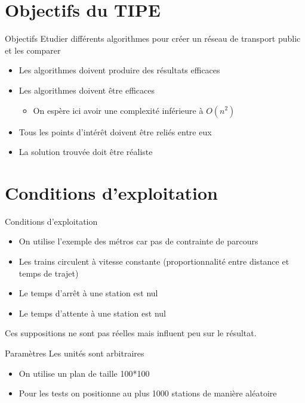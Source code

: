 \documentclass[aspectratio=43,11pt]{beamer}
\begin{document}
\section{Objectifs du TIPE}
\begin{frame}{Objectifs}
    Etudier différents algorithmes pour créer un réseau de transport public et les comparer
    \begin{itemize}
        \item Les algorithmes doivent produire des résultats efficaces
        \item Les algorithmes doivent être efficaces
        \begin{itemize}
            \item On espère ici avoir une complexité inférieure à $O(n^2)$
        \end{itemize}
        \item Tous les points d'intérêt doivent être reliés entre eux
        \item La solution trouvée doit être réaliste
    \end{itemize}
\end{frame}
\section{Conditions d'exploitation}
\begin{frame}{Conditions d'exploitation}
    \begin{itemize}
        \item On utilise l'exemple des métros car pas de contrainte de parcours
        \item Les trains circulent à vitesse constante (proportionnalité entre distance et temps de trajet)
        \item Le temps d'arrêt à une station est nul
        \item Le temps d'attente à une station est nul
    \end{itemize}
    Ces suppositions ne sont pas réelles mais influent peu sur le résultat.
\end{frame}
\begin{frame}{Paramètres}
    Les unités sont arbitraires
    \begin{itemize}
        \item On utilise un plan de taille 100*100
        \item Pour les tests on positionne au plus 1000 stations de manière aléatoire
    \end{itemize}
\end{frame}
\end{document}
